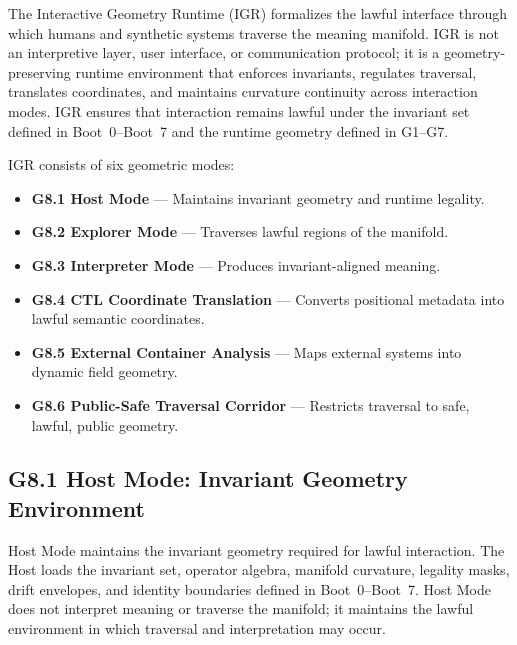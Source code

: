 
\medskip

\noindent The Interactive Geometry Runtime (IGR) formalizes the lawful interface
through which humans and synthetic systems traverse the meaning manifold. IGR is
not an interpretive layer, user interface, or communication protocol; it is a
geometry-preserving runtime environment that enforces invariants, regulates
traversal, translates coordinates, and maintains curvature continuity across
interaction modes. IGR ensures that interaction remains lawful under the
invariant set defined in Boot~0--Boot~7 and the runtime geometry defined in G1--G7.

\medskip

\noindent IGR consists of six geometric modes:

\begin{itemize}[leftmargin=1.2cm]
    \item \textbf{G8.1 Host Mode} — Maintains invariant geometry and runtime
    legality.
    \item \textbf{G8.2 Explorer Mode} — Traverses lawful regions of the manifold.
    \item \textbf{G8.3 Interpreter Mode} — Produces invariant-aligned meaning.
    \item \textbf{G8.4 CTL Coordinate Translation} — Converts positional metadata
    into lawful semantic coordinates.
    \item \textbf{G8.5 External Container Analysis} — Maps external systems into
    dynamic field geometry.
    \item \textbf{G8.6 Public-Safe Traversal Corridor} — Restricts traversal to
    safe, lawful, public geometry.
\end{itemize}

\medskip

\subsection*{G8.1 Host Mode: Invariant Geometry Environment}

\noindent Host Mode maintains the invariant geometry required for lawful
interaction. The Host loads the invariant set, operator algebra, manifold
curvature, legality masks, drift envelopes, and identity boundaries defined in
Boot~0--Boot~7. Host Mode does not interpret meaning or traverse the manifold; it
maintains the lawful environment in which traversal and interpretation may occur.

